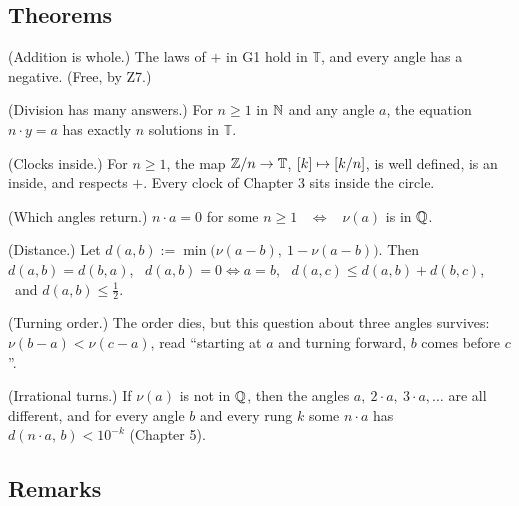 \subsection*{Theorems}

\begin{lines}
\item[\lab{T1}] (Addition is whole.) The laws of $+$ in G1 hold in $\mathbb{T}$, and every angle has a negative. (Free, by Z7.)
\item[\lab{T2}] (Division has many answers.) For $n \ge 1$ in $\mathbb{N}$ and any angle $a$, the equation $n \cdot y = a$ has exactly $n$ solutions in $\mathbb{T}$.
\item[\lab{T3}] (Clocks inside.) For $n \ge 1$, the map $\mathbb{Z}/n \to \mathbb{T}$, $[k] \mapsto [k/n]$, is well defined, is an inside, and respects $+$. Every clock of Chapter 3 sits inside the circle.
\item[\lab{T4}] (Which angles return.) $n \cdot a = 0$ for some $n \ge 1$ \ $\iff$ \ $\nu(a)$ is in $\mathbb{Q}$.
\item[\lab{T5}] (Distance.) Let $d(a, b) := \min\bigl(\nu(a - b),\ 1 - \nu(a - b)\bigr)$. Then $d(a,b) = d(b,a)$, \ $d(a,b) = 0 \iff a = b$, \ $d(a,c) \le d(a,b) + d(b,c)$, \ and $d(a,b) \le \tfrac12$.
\item[\lab{T6}] (Turning order.) The order dies, but this question about three angles survives: \ $\nu(b - a) < \nu(c - a)$, read ``starting at $a$ and turning forward, $b$ comes before $c$''.
\item[\lab{T7}] (Irrational turns.) If $\nu(a)$ is not in $\mathbb{Q}$, then the angles $a,\ 2 \cdot a,\ 3 \cdot a, \dots$ are all different, and for every angle $b$ and every rung $k$ some $n \cdot a$ has $d(n \cdot a,\, b) < 10^{-k}$ (Chapter 5).
\end{lines}

\subsection*{Remarks}

